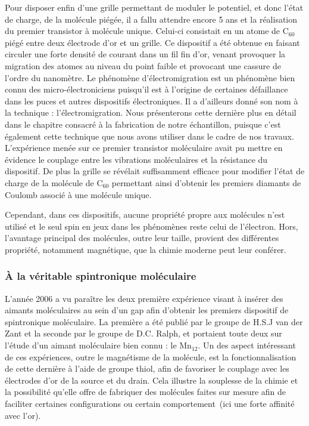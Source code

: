 Pour disposer enfin d'une grille permettant de moduler le potentiel, et donc l'état de charge, de la molécule piégée, il a fallu attendre encore 5 ans et la réalisation du premier transistor à molécule unique. Celui-ci consistait en un atome de C$_{60}$ piégé entre deux électrode d'or et un grille. Ce dispositif a été obtenue en faisant circuler une forte densité de courant dans un fil fin d'or, venant provoquer la migration des atomes au niveau du point faible et provocant une cassure de l'ordre du nanomètre. Le phénomène d'électromigration est un phénomène bien connu des micro-électroniciens puisqu'il est à l'origine de certaines défaillance dans les puces et autres dispositifs électroniques. Il a d'ailleurs donné son nom à la technique : l'électromigration. Nous présenterons cette dernière plus en détail dans le chapitre consacré à la fabrication de notre échantillon, puisque c'est également cette technique que nous avons utiliser dans le cadre de nos travaux. L'expérience menée sur ce premier transistor moléculaire avait pu mettre en évidence le couplage entre les vibrations moléculaires et la résistance du dispositif. De plus la grille se révélait suffisamment efficace pour modifier l'état de charge de la molécule de C$_{60}$ permettant ainsi d'obtenir les premiers diamants de Coulomb associé à une molécule unique.

Cependant, dans ces dispositifs, aucune propriété propre aux molécules n'est utilisé et le seul spin en jeux dans les phénomènes reste celui de l'électron. Hors, l'avantage principal des molécules, outre leur taille, provient des différentes propriété, notamment magnétique, que la chimie moderne peut leur  conférer.

\subsubsection*{\`A la véritable spintronique moléculaire}

L'année 2006 a vu paraître les deux première expérience visant à insérer des aimants moléculaires au sein d'un gap afin d'obtenir les premiers dispositif de spintronique moléculaire. La première a été publié par le groupe de H.S.J van der Zant et la seconde par le groupe de D.C. Ralph, et portaient toute deux sur l'étude d'un aimant moléculaire bien connu : le Mn$_{12}$. Un des aspect intéressant de ces expériences, outre le magnétisme de la molécule, est la fonctionnalisation de cette dernière à l'aide de groupe thiol, afin de favoriser le couplage avec les électrodes d'or de la source et du drain. Cela illustre la souplesse de la chimie et la possibilité qu'elle offre de fabriquer des molécules faites sur mesure afin de faciliter certaines configurations ou certain comportement~(ici une forte affinité avec l'or).  


